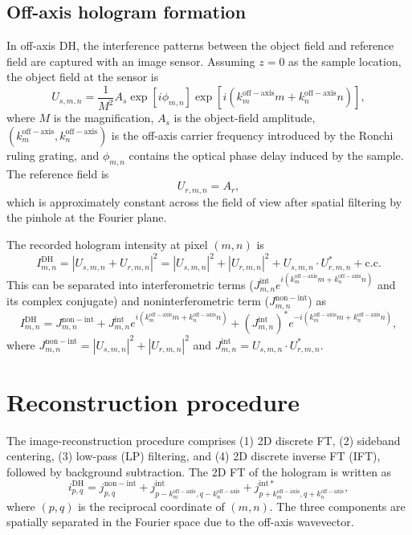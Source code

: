 \subsection{Off-axis hologram formation}

In off-axis DH, the interference patterns between the object field and reference field are captured with an image sensor. Assuming $z = 0$ as the sample location, the object field at the sensor is
\begin{equation}
U_{s,m,n} = \frac{1}{M^2} A_s \exp[i\phi_{m,n}] \exp[i(k_m^{\mathrm{off-axis}} m + k_n^{\mathrm{off-axis}} n)],
\end{equation}
where $M$ is the magnification, $A_s$ is the object-field amplitude, $(k_m^{\mathrm{off-axis}}, k_n^{\mathrm{off-axis}})$ is the off-axis carrier frequency introduced by the Ronchi ruling grating, and $\phi_{m,n}$ contains the optical phase delay induced by the sample. The reference field is
\begin{equation}
U_{r,m,n} = A_r,
\end{equation}
which is approximately constant across the field of view after spatial filtering by the pinhole at the Fourier plane.

The recorded hologram intensity at pixel $(m,n)$ is
\begin{equation}
I_{m,n}^{\mathrm{DH}} = \left|U_{s,m,n} + U_{r,m,n}\right|^2 = |U_{s,m,n}|^2 + |U_{r,m,n}|^2 + U_{s,m,n} \cdot U_{r,m,n}^* + \mathrm{c.c.}
\end{equation}
This can be separated into interferometric terms ($J_{m,n}^{\mathrm{int}} e^{i(k_m^{\mathrm{off-axis}}m + k_n^{\mathrm{off-axis}}n)}$ and its complex conjugate) and noninterferometric term ($J_{m,n}^{\mathrm{non-int}}$) as
\begin{equation}
I_{m,n}^{\mathrm{DH}} = J_{m,n}^{\mathrm{non-int}} + J_{m,n}^{\mathrm{int}} e^{i(k_m^{\mathrm{off-axis}}m + k_n^{\mathrm{off-axis}}n)} + (J_{m,n}^{\mathrm{int}})^* e^{-i(k_m^{\mathrm{off-axis}}m + k_n^{\mathrm{off-axis}}n)},
\end{equation}
where $J_{m,n}^{\mathrm{non-int}} = |U_{s,m,n}|^2 + |U_{r,m,n}|^2$ and $J_{m,n}^{\mathrm{int}} = U_{s,m,n} \cdot U_{r,m,n}^*$.

\section{Reconstruction procedure}

The image-reconstruction procedure comprises (1) 2D discrete FT, (2) sideband centering, (3) low-pass (LP) filtering, and (4) 2D discrete inverse FT (IFT), followed by background subtraction. The 2D FT of the hologram is written as
\begin{equation}
i_{p,q}^{\mathrm{DH}} = j_{p,q}^{\mathrm{non-int}} + j_{p-k_m^{\mathrm{off-axis}}, q-k_n^{\mathrm{off-axis}}}^{\mathrm{int}} + j_{p+k_m^{\mathrm{off-axis}}, q+k_n^{\mathrm{off-axis}}}^{\mathrm{int}*},
\end{equation}
where $(p,q)$ is the reciprocal coordinate of $(m,n)$. The three components are spatially separated in the Fourier space due to the off-axis wavevector.

